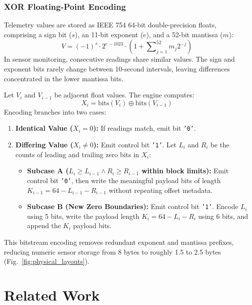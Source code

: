 \documentclass[conference,a4paper]{IEEEtran}
\newcommand{\code}[1]{\texttt{\small #1}}
\begin{document}
\subsubsection{XOR Floating-Point Encoding}
Telemetry values are stored as IEEE 754 64-bit double-precision floats, comprising a sign bit ($s$), an 11-bit exponent ($e$), and a 52-bit mantissa ($m$):
\begin{equation}
    V = (-1)^s \cdot 2^{e - 1023} \cdot \left(1 + \sum\nolimits_{j=1}^{52} m_j 2^{-j}\right)
\end{equation}
In sensor monitoring, consecutive readings share similar values. The sign and exponent bits rarely change between 10-second intervals, leaving differences concentrated in the lower mantissa bits.

Let $V_i$ and $V_{i-1}$ be adjacent float values. The engine computes:
\begin{equation}
    X_i = \mathrm{bits}(V_i) \oplus \mathrm{bits}(V_{i-1})
\end{equation}
Encoding branches into two cases:
\begin{enumerate}
    \item \textbf{Identical Value ($X_i = 0$):} If readings match, emit bit \code{'0'}.
    \item \textbf{Differing Value ($X_i \ne 0$):} Emit control bit \code{'1'}. Let $L_i$ and $R_i$ be the counts of leading and trailing zero bits in $X_i$:
    \begin{itemize}
        \item \textbf{Subcase A ($L_i \ge L_{i-1} \land R_i \ge R_{i-1}$ within block limits):} Emit control bit \code{'0'}, then write the meaningful payload bits of length $K_{i-1} = 64 - L_{i-1} - R_{i-1}$ without repeating offset metadata.
        \item \textbf{Subcase B (New Zero Boundaries):} Emit control bit \code{'1'}. Encode $L_i$ using 5 bits, write the payload length $K_i = 64 - L_i - R_i$ using 6 bits, and append the $K_i$ payload bits.
    \end{itemize}
\end{enumerate}
This bitstream encoding removes redundant exponent and mantissa prefixes, reducing numeric sensor storage from 8 bytes to roughly 1.5 to 2.5 bytes (Fig.~\ref{fig:physical_layouts}).

\section{Related Work}
\end{document}
